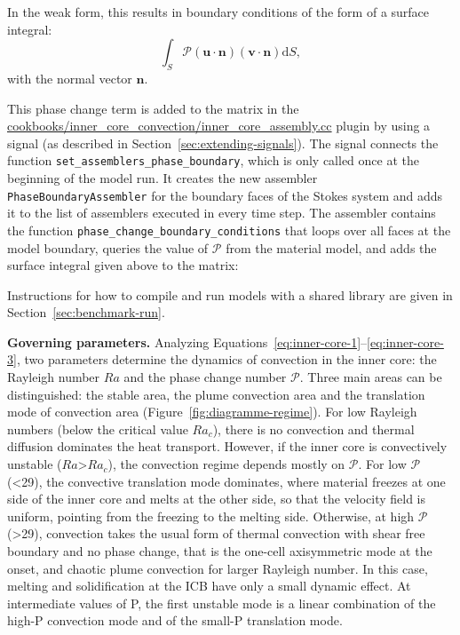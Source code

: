 \documentclass{article}
\begin{document}
In the weak form, this results in boundary conditions of the form
of a surface integral:
\begin{equation*}
\int_S \mathcal{P} (\mathbf u \cdot \mathbf n) (\mathbf v \cdot \mathbf n) \text{d}S,
\end{equation*}
with the normal vector $\mathbf n$.

This phase change term is added to the matrix in the 
\url{cookbooks/inner_core_convection/inner_core_assembly.cc} plugin by using a signal 
(as described in Section~\ref{sec:extending-signals}). The signal 
connects the function \verb!set_assemblers_phase_boundary!, which is only called once at the beginning of 
the model run. It creates the new assembler \texttt{PhaseBoundaryAssembler} for the boundary faces of the Stokes 
system and adds it to the list of assemblers executed in every time step. 
The assembler contains the function \verb!phase_change_boundary_conditions! that loops over all faces at the model 
boundary, queries the value of $\mathcal{P}$ from the material model, and adds the surface integral given above
to the matrix:

Instructions for how to compile and run models with a shared library are given in Section~\ref{sec:benchmark-run}.

\vspace{0.3cm}
\textbf{Governing parameters.}  Analyzing Equations~\eqref{eq:inner-core-1}--\eqref{eq:inner-core-3}, two parameters determine 
the dynamics of convection in the inner core: the Rayleigh number $Ra$ and the phase change number $\mathcal{P}$. 
Three main areas can be distinguished: the stable area, the plume convection area and the translation mode of convection area (Figure~\ref{fig:diagramme-regime}). For low Rayleigh numbers (below the critical value $Ra_c$), there is no convection and thermal diffusion dominates the heat transport. However, if the inner core is convectively unstable ($Ra$>$Ra_c$), the convection regime depends mostly on $\mathcal{P}$. For low $\mathcal{P}$ (<29), the convective translation mode dominates, where material freezes at one side of the inner core and melts at the other side, so that the velocity field is uniform, pointing from the freezing to the melting side. Otherwise, at high $\mathcal{P}$ (>29), convection takes the usual form of thermal convection with shear free boundary and no phase change, that is the one-cell axisymmetric mode at the onset, and chaotic plume convection for larger Rayleigh number. In this case, melting and solidification at the ICB have only a small dynamic effect. At intermediate values of P, the first unstable mode is a linear combination of the high-P convection mode and of the small-P translation mode.
\end{document}
